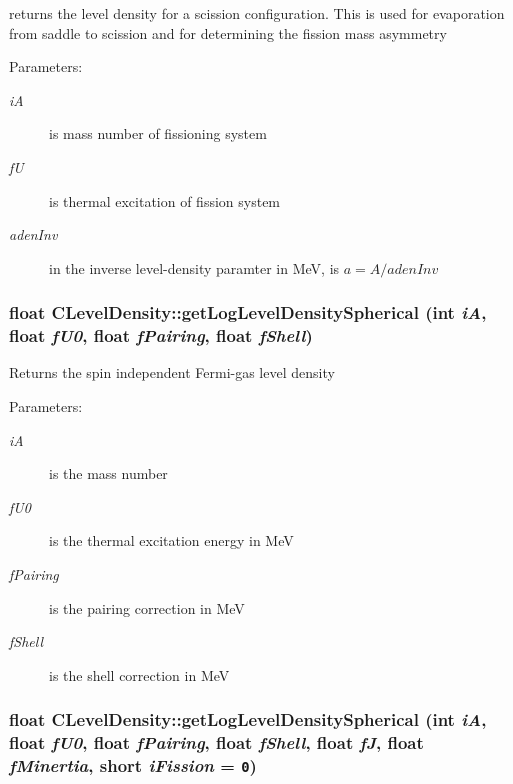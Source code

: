 returns the level density for a scission configuration. This is used for evaporation from saddle to scission and for determining the fission mass asymmetry \begin{Desc}
\item[Parameters:]
\begin{description}
\item[{\em i\-A}]is mass number of fissioning system \item[{\em f\-U}]is thermal excitation of fission system \item[{\em aden\-Inv}]in the inverse level-density paramter in Me\-V, is $a=A/adenInv$ \end{description}
\end{Desc}
\subsubsection{\setlength{\rightskip}{0pt plus 5cm}float CLevel\-Density::get\-Log\-Level\-Density\-Spherical (int {\em i\-A}, float {\em f\-U0}, float {\em f\-Pairing}, float {\em f\-Shell})}\label{classCLevelDensity_f91006c52fab6772f9a98868cf03425c}


Returns the spin independent Fermi-gas level density \begin{Desc}
\item[Parameters:]
\begin{description}
\item[{\em i\-A}]is the mass number \item[{\em f\-U0}]is the thermal excitation energy in Me\-V \item[{\em f\-Pairing}]is the pairing correction in Me\-V \item[{\em f\-Shell}]is the shell correction in Me\-V \end{description}
\end{Desc}
\subsubsection{\setlength{\rightskip}{0pt plus 5cm}float CLevel\-Density::get\-Log\-Level\-Density\-Spherical (int {\em i\-A}, float {\em f\-U0}, float {\em f\-Pairing}, float {\em f\-Shell}, float {\em f\-J}, float {\em f\-Minertia}, short {\em i\-Fission} = {\tt 0})}\label{classCLevelDensity_4bac625039f18d6d02c6a72070ae3ff3}


